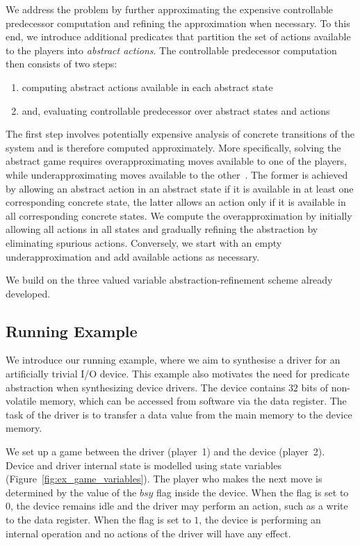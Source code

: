 We address the problem by further approximating the expensive controllable predecessor computation and refining the approximation when necessary. To this end, we introduce additional predicates that partition the set of actions available to the players into \emph{abstract actions}. The controllable predecessor computation then consists of two steps: 

\begin{enumerate}
    \item computing abstract actions available in each abstract state
    \item and, evaluating controllable predecessor over abstract states and actions
\end{enumerate}

The first step involves potentially expensive analysis of concrete transitions of the system and is therefore computed approximately. More specifically, solving the abstract game requires overapproximating moves available to one of the players, while underapproximating moves available to the other~\cite{Henzinger_JM_03}.  The former is achieved by allowing an abstract action in an abstract state if it is available in at least one corresponding concrete state, the latter allows an action only if it is available in all corresponding concrete states. We compute the overapproximation by initially allowing all actions in all states and gradually refining the abstraction by eliminating spurious actions.  Conversely, we start with an empty underapproximation and add available actions as necessary.

We build on the three valued variable abstraction-refinement scheme already developed. 

\subsection{Running Example}

We introduce our running example, where we aim to synthesise a driver for an artificially trivial I/O device. This example also motivates the need for predicate abstraction when synthesizing device drivers. The device contains $32$ bits of non-volatile memory, which can be accessed from software via the data register. The task of the driver is to transfer a data value from the main memory to the device memory.

We set up a game between the driver (player~1) and the device (player~2).  Device and driver internal state is modelled using state variables (Figure~\ref{fig:ex_game_variables}).  The player who makes the next move is determined by the value of the $bsy$ flag inside the device.  When the flag is set to $0$, the device remains idle and the driver may perform an action, such as a write to the data register.  When the flag is set to $1$, the device is performing an internal operation and no actions of the driver will have any effect. 

